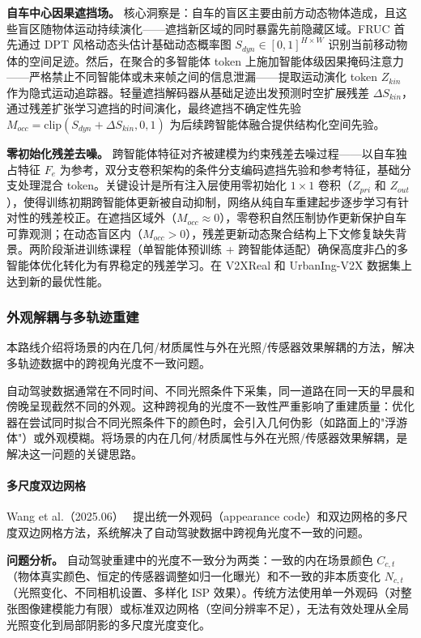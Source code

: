 \textbf{自车中心因果遮挡场。} 核心洞察是：自车的盲区主要由前方动态物体造成，且这些盲区随物体运动持续演化——遮挡新区域的同时暴露先前隐藏区域。FRUC 首先通过 DPT 风格动态头估计基础动态概率图 $S_{dyn} \in [0,1]^{H \times W}$ 识别当前移动物体的空间足迹。然后，在聚合的多智能体 token 上施加智能体级因果掩码注意力——严格禁止不同智能体或未来帧之间的信息泄漏——提取运动演化 token $Z_{kin}$ 作为隐式运动追踪器。轻量遮挡解码器从基础足迹出发预测时空扩展残差 $\Delta S_{kin}$，通过残差扩张学习遮挡的时间演化，最终遮挡不确定性先验 $M_{occ} = \text{clip}(S_{dyn} + \Delta S_{kin}, 0, 1)$ 为后续跨智能体融合提供结构化空间先验。

\textbf{零初始化残差去噪。} 跨智能体特征对齐被建模为约束残差去噪过程——以自车独占特征 $F_e$ 为参考，双分支卷积架构的条件分支编码遮挡先验和参考特征，基础分支处理混合 token。关键设计是所有注入层使用零初始化 $1 \times 1$ 卷积（$Z_{pri}$ 和 $Z_{out}$），使得训练初期跨智能体更新被自动抑制，网络从纯自车重建起步逐步学习有针对性的残差校正。在遮挡区域外（$M_{occ} \approx 0$），零卷积自然压制协作更新保护自车可靠观测；在动态盲区内（$M_{occ} > 0$），残差更新动态聚合结构上下文修复缺失背景。两阶段渐进训练课程（单智能体预训练 + 跨智能体适配）确保高度非凸的多智能体优化转化为有界稳定的残差学习。在 V2XReal 和 UrbanIng-V2X 数据集上达到新的最优性能。

\subsubsection{外观解耦与多轨迹重建}

本路线介绍将场景的内在几何/材质属性与外在光照/传感器效果解耦的方法，解决多轨迹数据中的跨视角光度不一致问题。

自动驾驶数据通常在不同时间、不同光照条件下采集，同一道路在同一天的早晨和傍晚呈现截然不同的外观。这种跨视角的光度不一致性严重影响了重建质量：优化器在尝试同时拟合不同光照条件下的颜色时，会引入几何伪影（如路面上的"浮游体"）或外观模糊。将场景的内在几何/材质属性与外在光照/传感器效果解耦，是解决这一问题的关键思路。

\paragraph{多尺度双边网格}

Wang et al.（2025.06）~\cite{2506_05280} 提出统一外观码（appearance code）和双边网格的多尺度双边网格方法，系统解决了自动驾驶数据中跨视角光度不一致的问题。

\textbf{问题分析。} 自动驾驶重建中的光度不一致分为两类：一致的内在场景颜色 $C_{c,t}$（物体真实颜色、恒定的传感器调整如归一化曝光）和不一致的非本质变化 $N_{c,t}$（光照变化、不同相机设置、多样化 ISP 效果）。传统方法使用单一外观码（对整张图像建模能力有限）或标准双边网格（空间分辨率不足），无法有效处理从全局光照变化到局部阴影的多尺度光度变化。

